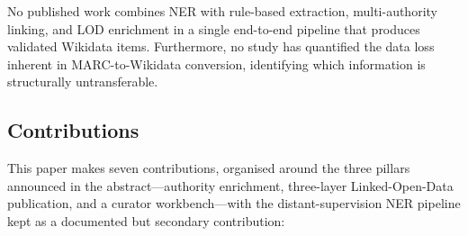 \documentclass[Afour,sageh,times]{sagej}
\begin{document}
No published work combines NER with rule-based extraction, multi-authority linking, and LOD enrichment in a single end-to-end pipeline that produces validated Wikidata items. Furthermore, no study has quantified the data loss inherent in MARC-to-Wikidata conversion, identifying which information is structurally untransferable.

\subsection{Contributions}

This paper makes seven contributions, organised around the three pillars announced in the abstract---authority enrichment, three-layer Linked-Open-Data publication, and a curator workbench---with the distant-supervision NER pipeline kept as a documented but secondary contribution:
\end{document}
